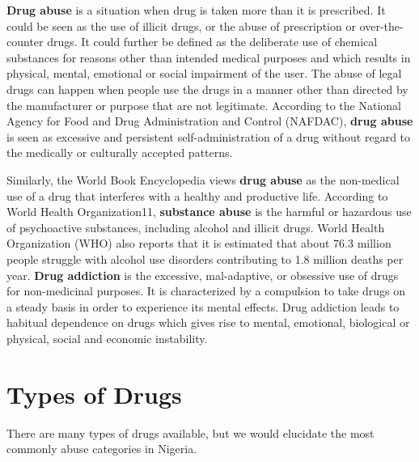 \documentclass{report}
\begin{document}
\textbf{Drug abuse} is a situation when drug is taken more than it is prescribed. It could be seen as the use of illicit drugs, or the abuse of prescription or over-the-counter drugs. It could further be defined as the deliberate use of chemical substances for reasons other than intended medical purposes and which results in  physical,  mental, emotional or social impairment of the user. The abuse of legal drugs  can happen when people use the drugs in a manner other than directed by the manufacturer or purpose that are not legitimate. According  to the  National Agency  for Food and Drug Administration and Control (NAFDAC), \textbf{drug abuse} is seen as excessive and persistent self-administration of a drug without regard to  the medically or culturally accepted patterns. 

Similarly,  the  World  Book Encyclopedia views \textbf{drug abuse} as the non-medical use of a drug  that interferes with a healthy and productive  life. According to World Health Organization11, \textbf{substance abuse} is the harmful or hazardous use of psychoactive substances, including alcohol and illicit drugs. World Health Organization (WHO) also reports that it is estimated that about 76.3 million people struggle with alcohol use disorders contributing to 1.8 million deaths per year. \textbf{Drug addiction} is the excessive,  mal-adaptive, or obsessive use of   drugs   for non-medicinal purposes. It is characterized by a compulsion to take drugs on a steady basis in order to experience its mental effects. Drug addiction leads to habitual dependence on drugs which gives rise  to  mental, emotional, biological or physical, social and economic instability.

\section{Types of Drugs}
There are many types of drugs available, but we would elucidate the most commonly abuse categories in Nigeria.
\end{document}
